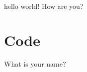 \documentclass{article}
\begin{document}
    hello world!
    How are you?

    \section{Code}
    What is your name?
\end{document}
